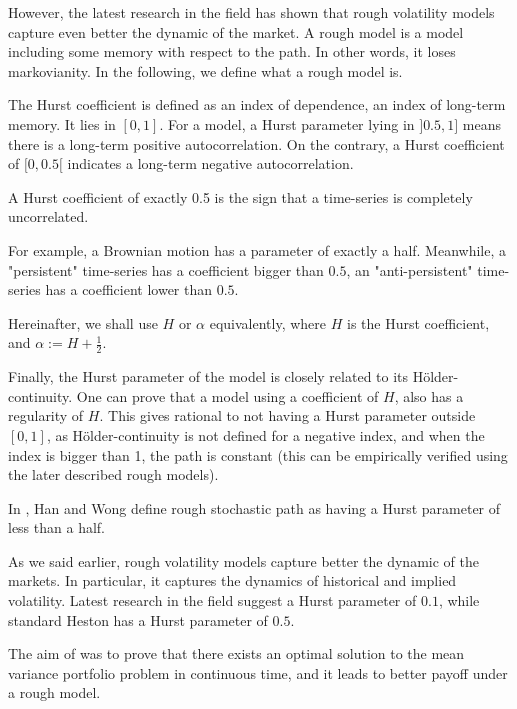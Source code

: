 However, the latest research in the field has shown that rough volatility models capture even better the dynamic of the market. A rough model is a model including some memory with respect to the path. In other words, it loses markovianity. In the following, we define what a rough model is.


\begin{definition}
The Hurst coefficient is defined as an index of dependence, an index of long-term memory. It lies in $[0,1]$. For a model, a Hurst parameter lying in $]0.5,1]$ means there is a long-term positive autocorrelation. On the contrary, a Hurst coefficient of $[0,0.5[$ indicates a long-term negative autocorrelation. 

A Hurst coefficient of exactly 0.5 is the sign that a time-series is  completely uncorrelated. 

For example, a Brownian motion has a parameter of exactly a half. Meanwhile, a "persistent" time-series has a coefficient bigger than $0.5$, an "anti-persistent" time-series has a coefficient lower than $0.5$. 
\end{definition}

\begin{remarque} 
Hereinafter, we shall use $H$ or $\alpha$ equivalently, where $H$ is the Hurst coefficient, and $\alpha := H + \frac 1 2$.
\end{remarque}


Finally, the Hurst parameter of the model is closely related to its Hölder-continuity. One can prove that a model using a coefficient of $H$, also has a regularity of $H$. This gives rational to not having a Hurst parameter outside $[0,1]$, as Hölder-continuity is not defined for a negative index, and when the index is bigger than 1, the path is constant (this can be empirically verified using the later described rough models).

In \cite{HanWong}, Han and Wong define rough stochastic path as having a Hurst parameter of less than a half. 

As we said earlier, rough volatility models capture better the dynamic of the markets. In particular, it captures the dynamics of historical and implied volatility. Latest research in the field suggest a Hurst parameter of $0.1$, while standard Heston has a Hurst parameter of $0.5$.

The aim of \cite{HanWong} was to prove that there exists an optimal solution to the mean variance portfolio problem in continuous time, and it leads to better payoff under a rough model.


